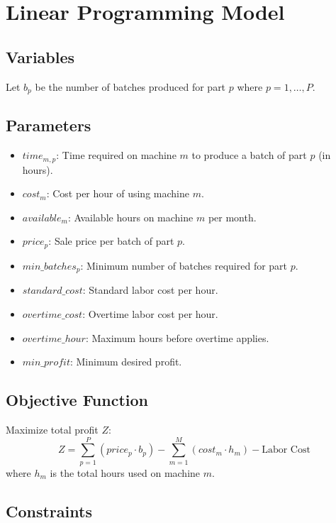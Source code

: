 \documentclass{article}
\begin{document}
\section*{Linear Programming Model}

\subsection*{Variables}
Let \( b_p \) be the number of batches produced for part \( p \) where \( p = 1, \ldots, P \).

\subsection*{Parameters}
\begin{itemize}
    \item \( time_{m,p} \): Time required on machine \( m \) to produce a batch of part \( p \) (in hours).
    \item \( cost_m \): Cost per hour of using machine \( m \).
    \item \( available_m \): Available hours on machine \( m \) per month.
    \item \( price_p \): Sale price per batch of part \( p \).
    \item \( min\_batches_p \): Minimum number of batches required for part \( p \).
    \item \( standard\_cost \): Standard labor cost per hour.
    \item \( overtime\_cost \): Overtime labor cost per hour.
    \item \( overtime\_hour \): Maximum hours before overtime applies.
    \item \( min\_profit \): Minimum desired profit.
\end{itemize}

\subsection*{Objective Function}
Maximize total profit \( Z \):
\[
Z = \sum_{p=1}^{P} \left( price_p \cdot b_p \right) - \sum_{m=1}^{M} \left( cost_m \cdot h_m \right) - \text{Labor Cost}
\]
where \( h_m \) is the total hours used on machine \( m \).

\subsection*{Constraints}
\end{document}
